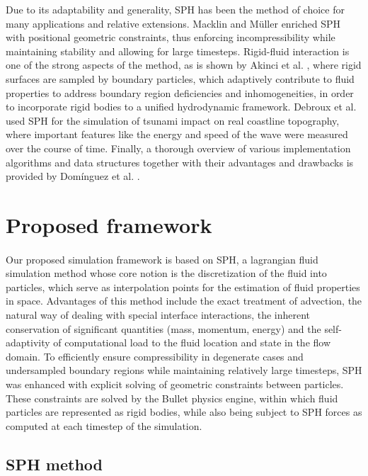 \documentclass{llncs}
\begin{document}
Due to its adaptability and generality, SPH has been the method of choice for many
applications and relative extensions. Macklin and M\"{u}ller \cite{macklin2013position}
enriched SPH with positional geometric constraints, thus enforcing incompressibility while
maintaining stability and allowing for large timesteps. Rigid-fluid interaction is one of
the strong aspects of the method, as is shown by Akinci et al. \cite{akinci2012versatile},
where rigid surfaces are sampled by boundary particles, which adaptively contribute to
fluid properties to address boundary region deficiencies and inhomogeneities, in order to
incorporate rigid bodies to a unified hydrodynamic framework. Debroux et
al. \cite{debroux2001three} used SPH for the simulation of tsunami impact on real
coastline topography, where important features like the energy and speed of the wave were
measured over the course of time. Finally, a thorough overview of various implementation
algorithms and data structures together with their advantages and drawbacks is provided by
Dom\'{i}nguez et al. \cite{dominguez2011}.

\section{Proposed framework}
\paragraph{} Our proposed simulation framework is based on SPH, a lagrangian fluid
simulation method whose core notion is the discretization of the fluid into particles,
which serve as interpolation points for the estimation of fluid properties in
space. Advantages of this method include the exact treatment of advection, the natural way
of dealing with special interface interactions, the inherent conservation of significant
quantities (mass, momentum, energy) and the self-adaptivity of computational load to the
fluid location and state in the flow domain. To efficiently ensure compressibility in
degenerate cases and undersampled boundary regions while maintaining relatively large
timesteps, SPH was enhanced with explicit solving of geometric constraints between
particles. These constraints are solved by the Bullet physics engine, within which fluid
particles are represented as rigid bodies, while also being subject to SPH forces as
computed at each timestep of the simulation.

\subsection{SPH method}
\end{document}
